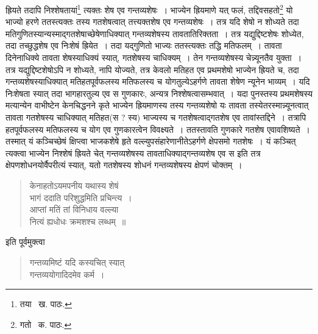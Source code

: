 \documentclass[11pt, openany]{book}
\begin{document}
\newpage

\noindent ह्रियते तदापि निश्शेषतायां\renewcommand{\thefootnote}{१}\footnote{तया \textendash\ ख. पाठः.} त्यक्तः शेष एव गन्तव्यशेषः~। भाज्येन ह्रियमाणे यत् फलं, तद्दिवसहतो\renewcommand{\thefootnote}{२}\footnote{गतो \textendash\ क. पाठः.} यो भाज्यो हरणे ततस्त्यक्तः तस्य गतशेषत्वात् तत्त्यक्तशेष एव गन्तव्यशेषः~। तत्र यदि शेषो न शोध्यते तदा मतिगुणितस्यान्यस्माद्गतशेषाच्छेषेणाधिक्यात् गन्तव्यशेषस्य तावतातिरिक्तता~। तत्र यद्युद्दिष्टशेषः शोध्येत, तदा तच्छुद्धशेष एव निःशेषं ह्रियेत~। तदा यद्गुणितो भाज्यः ततस्त्यक्तः तद्धि मतिफलम्~। तावता दिनेनाधिक्ये तावता शेषस्याधिक्यं स्यात्, गतशेषस्य चाधिक्यम्~। तेन गन्तव्यशेषस्य चेन्न्यूनतैव युक्ता~। तत्र यद्युद्दिष्टशेषोऽपि न शोध्यते, नापि योज्यते, तत्र केवलो मतिहत एव प्रथमशेषो भाज्येन ह्रियते च, तदा गन्तव्यशेषस्याधिक्यात् मतिहतपूर्वफलस्य मतिफलस्य च योगतुल्येऽहर्गणे तावता शेषेण न्यूनेन भाव्यम्~। यदि निःशेषता स्यात् तदा भागहारतुल्य एव स गुणकारः, अन्यत्र निश्शेषत्वासम्भवात्~। यदा पुनस्तस्य प्रथमशेषस्य मत्यान्येन वाभीष्टेन केनचिद्धनने कृते भाज्येन ह्रियमाणस्य तस्य गन्तव्यशेषो यः तावता तस्येतरस्मान्न्यूनत्वात् तावता गतशेषस्य चाधिक्यात् मतिहत(स ? स्य) भाज्यस्य च गतशेषत्वाद्गतशेष एव तावांस्तद्दिने~। तत्रापि हतपूर्वफलस्य मतिफलस्य च योग एव गुणकारत्वेन विवक्ष्यते~। ततस्तावति गुणकारे गतशेष एवावशिष्यते~। तस्मात् यं कञ्चिच्छेषं क्षिप्त्वा भाजकशेषे हृते वल्ल्युपसंहारेणानीतेऽहर्गणे क्षेपसमो गतशेषः~। यं कञ्चित् त्यक्त्वा भाज्येन निश्शेषं ह्रियते चेत् गन्तव्यशेषस्य तावताधिक्याद्गन्तव्यशेष एव स इति तत्र क्षेपणशोधनयोर्वैपरीत्यं स्यात्, यतो गतशेषस्य शोधनं गन्तव्यशेषस्य क्षेपणं चोक्तम्~।

\begin{quote}
{\qt केनाहतोऽयमपनीय यथास्य शेषं\\
भागं ददाति परिशुद्धमिति प्रचिन्त्य~।\\
आप्तां मतिं तां विनिधाय वल्ल्या\\
नित्यं ह्यधोधः क्रमशश्च लब्धम्~॥}
\end{quote}

\noindent इति पूर्वमुक्त्वा

\begin{quote}
{\qt गन्तव्यमिष्टं यदि कस्यचित् स्यात्\\
गन्तव्ययोगादिदमेव कर्म~।}
\end{quote}

\newpage
\end{document}
